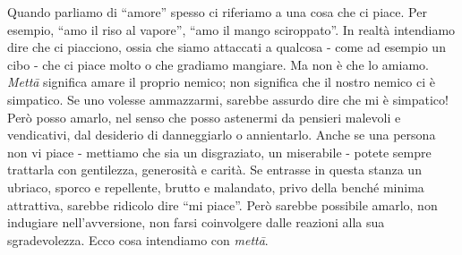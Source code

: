 
Quando parliamo di ``amore'' spesso ci riferiamo a una cosa che ci piace.
Per esempio, ``amo il riso al vapore'', ``amo il mango sciroppato''. In
realtà intendiamo dire che ci piacciono, ossia che siamo attaccati a
qualcosa - come ad esempio un cibo - che ci piace molto o che gradiamo
mangiare. Ma non è che lo amiamo. \textit{Mettā} significa amare il proprio
nemico; non significa che il nostro nemico ci è simpatico. Se uno
volesse ammazzarmi, sarebbe assurdo dire che mi è simpatico! Però posso
amarlo, nel senso che posso astenermi da pensieri malevoli e
vendicativi, dal desiderio di danneggiarlo o annientarlo. Anche se una
persona non vi piace - mettiamo che sia un disgraziato, un miserabile -
potete sempre trattarla con gentilezza, generosità e carità. Se entrasse
in questa stanza un ubriaco, sporco e repellente, brutto e malandato,
privo della benché minima attrattiva, sarebbe ridicolo dire ``mi piace''.
Però sarebbe possibile amarlo, non indugiare nell'avversione, non farsi
coinvolgere dalle reazioni alla sua sgradevolezza. Ecco cosa intendiamo
con \textit{mettā}.

